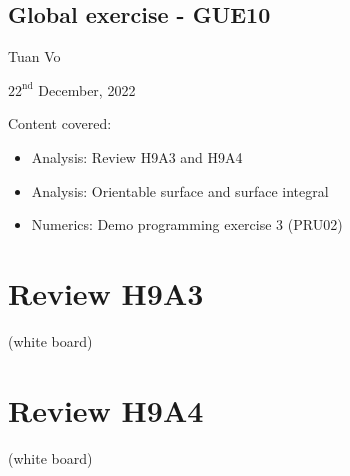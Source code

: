 \documentclass[12pt]{article}
\begin{document}
\begin{center}
	\section*{Global exercise - GUE10}
\end{center}
\begin{center}
	Tuan Vo
\end{center}
\begin{center}
	$22^{\text{nd}}$ December, 2022
\end{center}
Content covered:
\begin{itemize}
	\item[\checkmark] Analysis: Review H9A3 and H9A4
	\item[\checkmark] Analysis: Orientable surface and surface integral
	\item[\checkmark] Numerics: Demo programming exercise 3 (PRU02)
\end{itemize}
\section{Review H9A3}
 (white board)
\section{Review H9A4}
 (white board)
\clearpage
\end{document}
